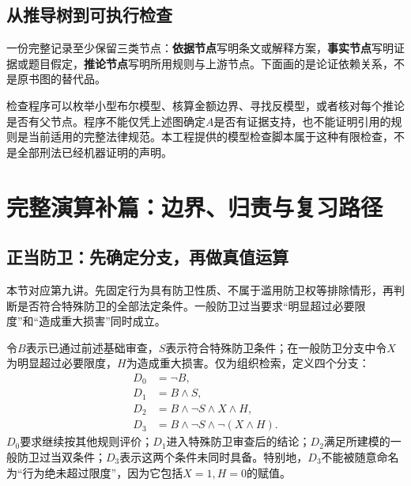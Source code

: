 \section{从推导树到可执行检查}
一份完整记录至少保留三类节点：\textbf{依据节点}写明条文或解释方案，\textbf{事实节点}写明证据或题目假定，\textbf{推论节点}写明所用规则与上游节点。下面画的是论证依赖关系，不是原书图的替代品。

\begingroup\setlength{\topsep}{3pt}
\begin{center}
\end{center}
\endgroup

检查程序可以枚举小型布尔模型、核算金额边界、寻找反模型，或者核对每个推论是否有父节点。程序不能仅凭上述图确定$A$是否有证据支持，也不能证明引用的规则是当前适用的完整法律规范。本工程提供的模型检查脚本属于这种有限检查，不是全部刑法已经机器证明的声明。

\chapter{完整演算补篇：边界、归责与复习路径}

\section{正当防卫：先确定分支，再做真值运算}
本节对应第九讲。先固定行为具有防卫性质、不属于滥用防卫权等排除情形，再判断是否符合特殊防卫的全部法定条件。一般防卫过当要求“明显超过必要限度”和“造成重大损害”同时成立。

令$B$表示已通过前述基础审查，$S$表示符合特殊防卫条件；在一般防卫分支中令$X$为明显超过必要限度，$H$为造成重大损害。仅为组织检索，定义四个分支：
\begin{align*}
 D_0&=\neg B,\\
 D_1&=B\wedge S,\\
 D_2&=B\wedge\neg S\wedge X\wedge H,\\
 D_3&=B\wedge\neg S\wedge\neg(X\wedge H).
\end{align*}
$D_0$要求继续按其他规则评价；$D_1$进入特殊防卫审查后的结论；$D_2$满足所建模的一般防卫过当双条件；$D_3$表示这两个条件未同时具备。特别地，$D_3$不能被随意命名为“行为绝未超过限度”，因为它包括$X=1,H=0$的赋值。

